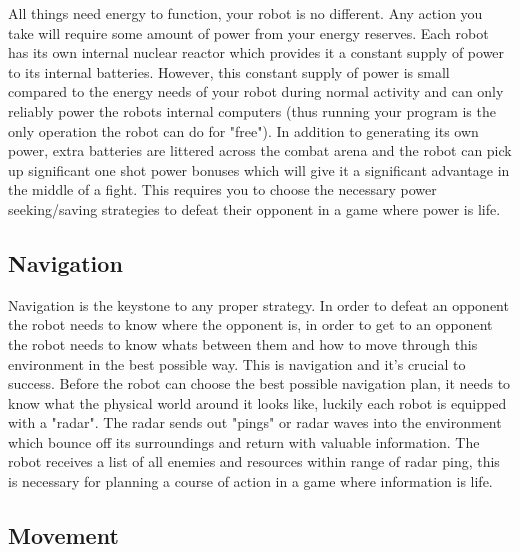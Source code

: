 \documentclass[a4paper]{article}
\begin{document}
All things need energy to function, your robot is no different. Any action you take will require some amount of power from your energy reserves. Each robot has its own internal nuclear reactor which provides it a constant supply of power to its internal batteries. However, this constant supply of power is small compared to the energy needs of your robot during normal activity and can only reliably power the robots internal computers (thus running your program is the only operation the robot can do for "free"). In addition to generating its own power, extra batteries are littered across the combat arena and the robot can pick up significant one shot power bonuses which will give it a significant advantage in the middle of a fight. This requires you to choose the necessary power seeking/saving strategies to defeat their opponent in a game where power is life.\\

\subsection{Navigation}

Navigation is the keystone to any proper strategy. In order to defeat an opponent the robot needs to know where the opponent is, in order to get to an opponent the robot needs to know whats between them and how to move through this environment in the best possible way. This is navigation and it's crucial to success. Before the robot can choose the best possible navigation plan, it needs to  know what the physical world around it looks like, luckily each robot is equipped with a "radar". The radar sends out "pings" or radar waves into the environment which bounce off its surroundings and return with valuable information. The robot receives a list of all enemies and resources within range of radar ping, this is necessary for planning a course of action in a game where information is life.\\

\subsection{Movement}
\end{document}
